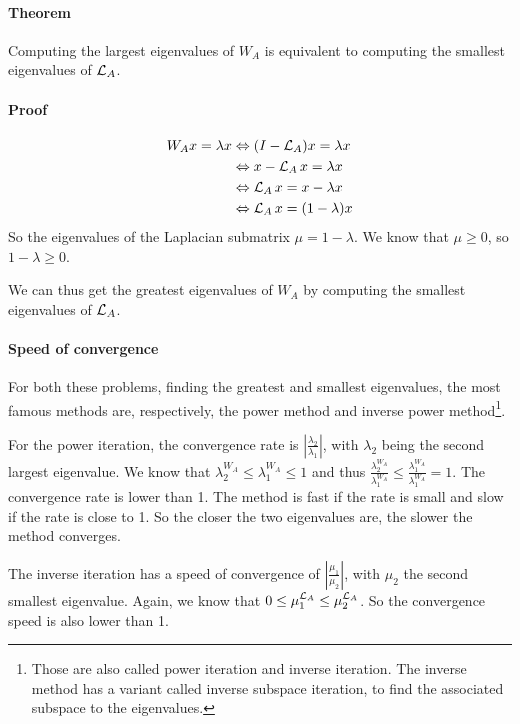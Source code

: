 \paragraph{Theorem}
Computing the largest eigenvalues of \(W_A\) is equivalent to computing the smallest eigenvalues of \(\operatorname{\mathcal{L}}_A\).

\paragraph{Proof}

\begin{equation}
 \begin{split}
     W_A x = \lambda x & \Leftrightarrow (I - \operatorname{\mathcal{L}}_A)x = \lambda x \\
                     & \Leftrightarrow x - \operatorname{\mathcal{L}}_A x = \lambda x \\
                     & \Leftrightarrow \operatorname{\mathcal{L}}_A x = x - \lambda x \\
                     & \Leftrightarrow \operatorname{\mathcal{L}}_A x = (1 - \lambda) x
 \end{split}
\end{equation}
So the eigenvalues of the Laplacian submatrix \(\mu = 1 - \lambda\).
We know that \(\mu \ge 0\), so \(1 - \lambda \ge 0\).

We can thus get the greatest eigenvalues of \(W_A\) by computing the smallest eigenvalues of \(\operatorname{\mathcal{L}}_A\).

\paragraph{Speed of convergence}
For both these problems, finding the greatest and smallest eigenvalues, the most famous methods are, respectively, the power method and inverse power method\footnote{Those are also called power iteration and inverse iteration. The inverse method has a variant called inverse subspace iteration, to find the associated subspace to the eigenvalues.}.

For the power iteration, the convergence rate is \(|\frac{\lambda_2}{\lambda_1}|\), with \(\lambda_2\) being the second largest eigenvalue.
We know that \(\lambda^{W_A}_2 \le \lambda^{W_A}_1 \le 1\) and thus \(\frac{\lambda^{W_A}_2}{\lambda^{W_A}_1} \le \frac{\lambda^{W_A}_1}{\lambda^{W_A}_1} = 1\).
The convergence rate is lower than 1.
The method is fast if the rate is small and slow if the rate is close to 1.
So the closer the two eigenvalues are, the slower the method converges.

The inverse iteration has a speed of convergence of \(|\frac{\mu_1}{\mu_2}|\), with \(\mu_2\) the second smallest eigenvalue.
Again, we know that \(0 \le \mu^{\operatorname{\mathcal{L}}_A}_1 \le \mu^{\operatorname{\mathcal{L}}_A}_2\).
So the convergence speed is also lower than 1.

